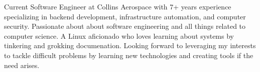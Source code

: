 

\begin{cvparagraph}

Current Software Engineer at Collins Aerospace with 7+ years experience specializing in backend development, infrastructure automation, and computer security. Passionate about about software engineering and all things related to computer science. A Linux aficionado who loves learning about systems by tinkering and grokking documenation. Looking forward to leveraging my interests to tackle difficult problems by learning new technologies and creating tools if the need arises.
\end{cvparagraph}
